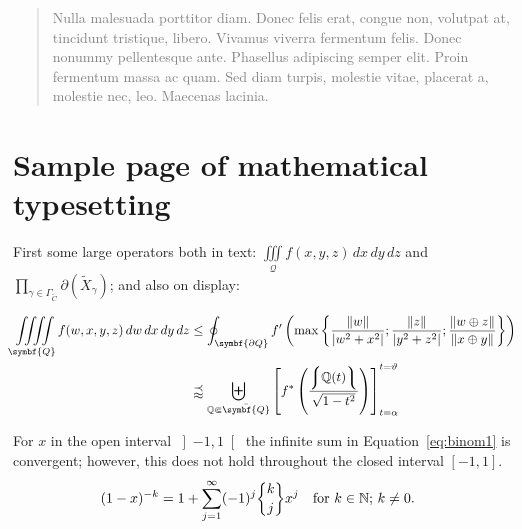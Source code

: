 \begin{quote}
\textcolor{gray}{\textsf{Nulla malesuada porttitor diam. Donec felis erat, congue non, volutpat at, tincidunt tristique, libero. Vivamus viverra fermentum felis. Donec nonummy pellentesque ante. Phasellus adipiscing semper elit. Proin fermentum massa ac quam. Sed diam turpis, molestie vitae, placerat a, molestie nec, leo. Maecenas lacinia.}}
\end{quote}



\newpage


\section{Sample page of mathematical typesetting}

First some large operators
both in text: \( \iiint\limits_{\mathcal{Q}}
f(x,y,z)\,dx\,dy\,dz \) and
\(\prod_{\gamma\in\Gamma_{\widetilde{C}}}
\partial(\widetilde{X}_\gamma)\); and also on display:

\begin{equation}
\begin{split}
\iiiint\limits_{\symbf{Q}} f(w,x,y,z)\,dw\,dx\,dy\,dz  &\leq
\oint_{\symbf{\partial Q}} f' \left( \max \left\lbrace
\frac{\lVert w \rVert}{\lvert w^2 + x^2 \rvert} ;
\frac{\lVert z \rVert}{\lvert y^2 + z^2 \rvert} ;
\frac{\lVert w \oplus z \rVert}{\lVert x \oplus y \rVert}
\right\rbrace\right)
\\
&\precapprox \biguplus_{\mathbb{Q} \Subset \bar{\symbf{Q}}}
\left[ f^{\ast} \left(
    \frac{\left\lmoustache\mathbb{Q}(t)\right\rmoustache}
         {\sqrt {1 - t^2}}
    \right)\right]_{t=\alpha}^{t=\vartheta}
\end{split}
\end{equation}

For $x$ in the open interval \( \left] -1, 1 \right[ \)
the infinite sum in Equation~\eqref{eq:binom1} is convergent;
however, this does not hold
throughout the closed interval \( \left[ -1, 1 \right] \).
\begin{align}
  (1 - x)^{-k} &=
    1 + \sum_{j=1}^{\infty} (-1)^j \genfrac\lbrace\rbrace{0pt}{}{k}{j} x^j
    \text{\quad for $k \in \mathbb{N}$; $k \neq 0$.}
    \label{eq:binom1}
\end{align}


